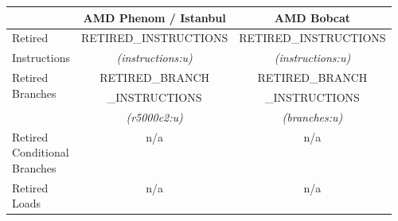 \begin{tabular}{|l||c|c|}

\hline
    & 
AMD Phenom / Istanbul&
AMD Bobcat \\
\hline
\hline


Retired                   &
RETIRED\_INSTRUCTIONS     & %
RETIRED\_INSTRUCTIONS    \\ %

Instructions                &
{\em (instructions:u)}      & %
{\em (instructions:u)}      \\ %

\hline
\multirow{3}{*}{\parbox{0.5in}{Retired \\
Branches}}                &
RETIRED\_BRANCH           & %
RETIRED\_BRANCH           \\ %
                  &  
\_INSTRUCTIONS       & %
\_INSTRUCTIONS      \\ %

                           &
{\em (r5000c2:u)}          & %
{\em (branches:u)}        \\ %

\hline
\multirow{3}{*}{\parbox{0.5in}{Retired \\
Conditional \\
Branches}}                &
\multirow{3}{*}{n/a}      & %
\multirow{3}{*}{n/a}     \\ %

                  &  
& %
\\ %

                      &
         & %
         \\ %


\hline
\multirow{3}{*}{\parbox{0.5in}{Retired \\Loads}}   &  
\multirow{3}{*}{n/a}      & %
\multirow{3}{*}{n/a}      \\ %

                         &
                         & %
                        \\ %

                         &
                         & %
                        \\ %


\end{tabular}
